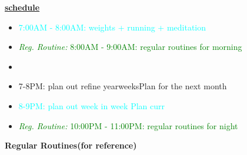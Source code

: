 \documentclass[11pt]{article}
\newcommand{\regItem}[1]{\item \textcolor{cyan}{#1}}
\newcommand{\regRoutineItem}[1]{\item \textcolor{green}{\textit{Reg. Routine:} #1}}
\begin{document}
\underline{\textbf{schedule}}\\
\begin{itemize}
\regItem{7:00AM - 8:00AM: weights + running + meditation }
\regRoutineItem {8:00AM - 9:00AM: regular routines for morning}
\item
\item 7-8PM: plan out refine yearweeksPlan for the next month
\regItem{8-9PM:  plan out week in week Plan curr}
\regRoutineItem{10:00PM - 11:00PM: regular routines for night}
\end{itemize}

\newpage

\textbf{Regular Routines(for reference)}

\end{document}
